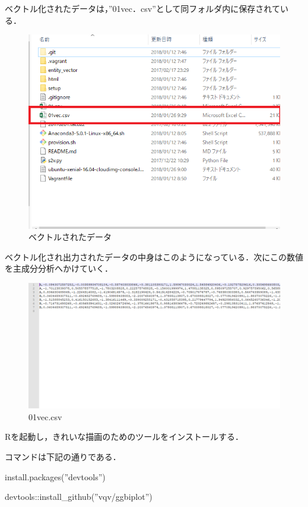 ベクトル化されたデータは，”01vec．csv”として同フォルダ内に保存されている．
\begin{figure}[htb]
\centering
\includegraphics[width=13cm]{4-34.png}
\caption{ベクトルされたデータ}\label{4-34}
\end{figure}
\newpage

ベクトル化され出力されたデータの中身はこのようになっている．次にこの数値を主成分分析へかけていく．

\begin{figure}[htb]
\centering
\includegraphics[width=13cm]{4-35.png}
\caption{01vec.csv}\label{4-35}
\end{figure}
\newpage

Rを起動し，きれいな描画のためのツールをインストールする．

コマンドは下記の通りである．

install.packages(”devtools”)

devtools::install\_github(”vqv/ggbiplot”)

